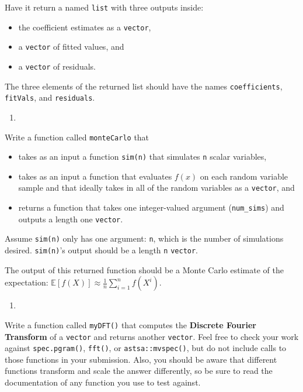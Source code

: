 \documentclass[
  12pt,
  krantz2]{krantz}
\providecommand{\tightlist}{%
  \setlength{\itemsep}{0pt}\setlength{\parskip}{0pt}}
\begin{document}
Have it return a named \texttt{list} with three outputs inside:

\begin{itemize}
\tightlist
\item
  the coefficient estimates as a \texttt{vector},
\item
  a \texttt{vector} of fitted values, and
\item
  a \texttt{vector} of residuals.
\end{itemize}

The three elements of the returned list should have the names \texttt{coefficients}, \texttt{fitVals}, and \texttt{residuals}.

\begin{enumerate}
\def\labelenumi{\arabic{enumi}.}
\setcounter{enumi}{1}
\tightlist
\item
\end{enumerate}

Write a function called \texttt{monteCarlo} that

\begin{itemize}
\tightlist
\item
  takes as an input a function \texttt{sim(n)} that simulates \texttt{n} scalar variables,\\
\item
  takes as an input a function that evaluates \(f(x)\) on each random variable sample and that ideally takes in all of the random variables as a \texttt{vector}, and
\item
  returns a function that takes one integer-valued argument (\texttt{num\_sims}) and outputs a length one \texttt{vector}.
\end{itemize}

Assume \texttt{sim(n)} only has one argument: \texttt{n}, which is the number of simulations desired. \texttt{sim(n)}'s output should be a length \texttt{n} \texttt{vector}.

The output of this returned function should be a Monte Carlo estimate of the expectation: \(\mathbb{E}[f(X)] \approx \frac{1}{n}\sum_{i=1}^n f(X^i)\).

\begin{enumerate}
\def\labelenumi{\arabic{enumi}.}
\setcounter{enumi}{2}
\tightlist
\item
\end{enumerate}

Write a function called \texttt{myDFT()} that computes the \textbf{Discrete Fourier Transform} of a \texttt{vector} and returns another \texttt{vector}. Feel free to check your work against \texttt{spec.pgram()}, \texttt{fft()}, or \texttt{astsa::mvspec()}, but do not include calls to those functions in your submission. Also, you should be aware that different functions transform and scale the answer differently, so be sure to read the documentation of any function you use to test against.
\end{document}
